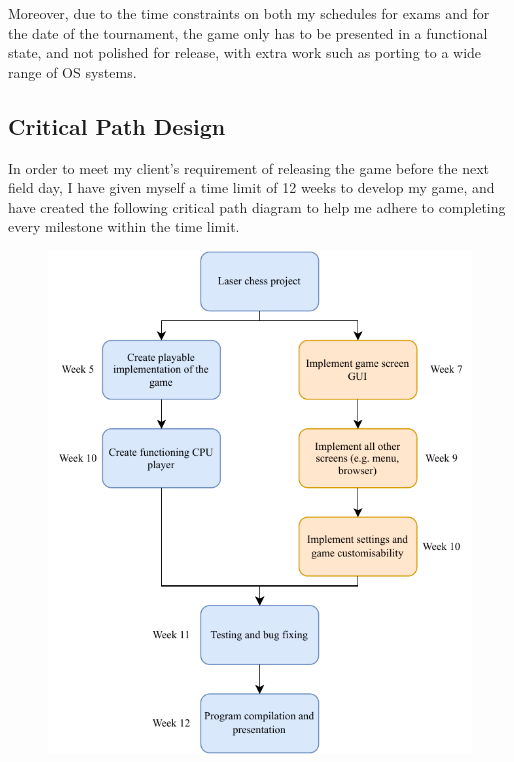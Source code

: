 \documentclass[../main/main.tex]{subfiles}
\begin{document}
Moreover, due to the time constraints on both my schedules for exams and for the date of the tournament, the game only has to be presented in a functional state, and not polished for release, with extra work such as porting to a wide range of OS systems.

\subsection{Critical Path Design}
In order to meet my client’s requirement of releasing the game before the next field day, I have given myself a time limit of 12 weeks to develop my game, and have created the following critical path diagram to help me adhere to completing every milestone within the time limit.

\begin{figure}[H]
    \centering
    \includegraphics[width=\columnwidth]{../analysis/assets/critical_path_diagram.pdf}
    \label{fig:critical-path-diagram}
\end{figure}
\end{document}
